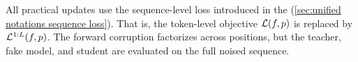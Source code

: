     All practical updates use the sequence-level loss introduced in the (\wasyparagraph\ref{sec:unified notations sequence loss}). That is, the token-level objective $\mathcal{L}(f,p)$ is replaced by $\mathcal{L}^{1:L}(f,p)$. The forward corruption factorizes across positions, but the teacher, fake model, and student are evaluated on the full noised sequence.
